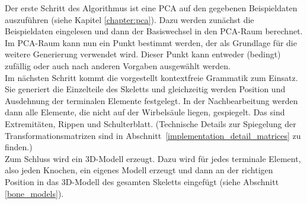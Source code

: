 \vspace{0.1cm}

Der erste Schritt des Algorithmus ist eine PCA auf den gegebenen Beispieldaten auszuführen (siehe Kapitel \ref{chapter:pca}). Dazu werden zunächst die Beispieldaten eingelesen und dann der Basiswechsel in den PCA-Raum berechnet. Im PCA-Raum kann nun ein Punkt bestimmt werden, der als Grundlage für die weitere Generierung verwendet wird. Dieser Punkt kann entweder (bedingt) zufällig oder auch nach anderen Vorgaben ausgewählt werden.\\
Im nächsten Schritt kommt die vorgestellt kontextfreie Grammatik zum Einsatz. Sie generiert die Einzelteile des Skeletts und gleichzeitig werden Position und Ausdehnung der terminalen Elemente festgelegt.
In der Nachbearbeitung werden dann alle Elemente, die nicht auf der Wirbelsäule liegen, gespiegelt. Das sind Extremitäten, Rippen und Schulterblatt. (Technische Details zur Spiegelung der Transformationsmatrizen sind in \mbox{Abschnitt \ref{implementation_detail_matrices}} zu finden.)\\
Zum Schluss wird ein 3D-Modell erzeugt. Dazu wird für jedes terminale Element, also jeden Knochen, ein eigenes Modell erzeugt und dann an der richtigen Position in das 3D-Modell des gesamten Skeletts eingefügt (siehe Abschnitt \ref{bone_models}). 





